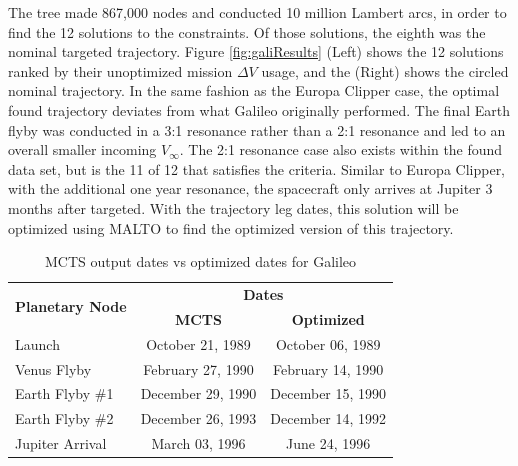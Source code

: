 \documentclass[letterpaper, preprint, paper,11pt]{AAS}	%
\begin{document}
The tree made 867,000 nodes and conducted 10 million Lambert arcs, in order to find the 12 solutions to the constraints. Of those solutions, the eighth was the nominal targeted trajectory. Figure \ref*{fig:galiResults} (Left) shows the 12 solutions ranked by their unoptimized mission $\Delta V$ usage, and the (Right) shows the circled nominal trajectory. In the same fashion as the Europa Clipper case, the optimal found trajectory deviates from what Galileo originally performed. The final Earth flyby was conducted in a 3:1 resonance rather than a 2:1 resonance and led to an overall smaller incoming $V_\infty$. The 2:1 resonance case also exists within the found data set, but is the 11 of 12 that satisfies the criteria. Similar to Europa Clipper, with the additional one year resonance, the spacecraft only arrives at Jupiter 3 months after targeted. With the trajectory leg dates, this solution will be optimized using MALTO to find the optimized version of this trajectory.
\begin{table}[htb]
    \begin{center}
        \caption{MCTS output dates vs optimized dates for Galileo}
        \label{table:galiMInputs}
        \begin{tabular}{lcc}
            \toprule
            \multirow{2}{*}{\textbf{Planetary Node}} & \multicolumn{2}{c}{\textbf{Dates}}\\
            \cmidrule{2-3}
            {} & \textbf{MCTS} & \textbf{Optimized}\\
            \midrule
            Launch          & October 21, 1989  & October 06, 1989\\
            Venus Flyby     & February 27, 1990 & February 14, 1990 \\
            Earth Flyby \#1 & December 29, 1990 & December 15, 1990 \\
            Earth Flyby \#2 & December 26, 1993 & December 14, 1992 \\
            Jupiter Arrival & March 03, 1996    & June 24, 1996 \\
            \bottomrule
        \end{tabular}
    \end{center}
\end{table}
\end{document}
